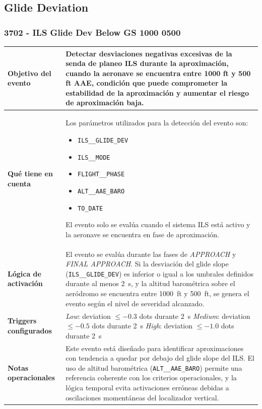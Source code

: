 \documentclass[11pt,a4paper]{article}
\begin{document}
	\subsection{Glide Deviation}
	
	\subsubsection{3702 - ILS Glide Dev Below GS 1000 0500}
	
	\renewcommand{\arraystretch}{1.3}
	\begin{longtable}{p{5cm} p{9.5cm}}
		\hline
		\textbf{Objetivo del evento} &
		Detectar desviaciones negativas excesivas de la senda de planeo ILS durante la aproximación, cuando la aeronave se encuentra entre 1000 ft y 500 ft AAE, condición que puede comprometer la estabilidad de la aproximación y aumentar el riesgo de aproximación baja. \\
		\hline
		
		\textbf{Qué tiene en cuenta} &
		Los parámetros utilizados para la detección del evento son:
		\begin{itemize}
			\item \texttt{ILS\_\_GLIDE\_DEV}
			\item \texttt{ILS\_\_MODE}
			\item \texttt{FLIGHT\_\_PHASE}
			\item \texttt{ALT\_\_AAE\_BARO}
			\item \texttt{TO\_DATE}
		\end{itemize}
		El evento solo se evalúa cuando el sistema ILS está activo y la aeronave se encuentra en fase de aproximación. \\
		\hline
		
		\textbf{Lógica de activación} &
		El evento se evalúa durante las fases de \textit{APPROACH} y \textit{FINAL APPROACH}.  
		Si la desviación del glide slope (\texttt{ILS\_\_GLIDE\_DEV}) es inferior o igual a los umbrales definidos durante al menos \SI{2}{s}, y la altitud barométrica sobre el aeródromo se encuentra entre \SI{1000}{ft} y \SI{500}{ft}, se genera el evento según el nivel de severidad alcanzado. \\
		\hline
		
		\textbf{Triggers configurados} &
		\textit{Low}: deviation $\leq -0.3$ dots durante \SI{2}{s} \newline
		\textit{Medium}: deviation $\leq -0.5$ dots durante \SI{2}{s} \newline
		\textit{High}: deviation $\leq -1.0$ dots durante \SI{2}{s} \\
		\hline
		
		\textbf{Notas operacionales} &
		Este evento está diseñado para identificar aproximaciones con tendencia a quedar por debajo del glide slope del ILS.  
		El uso de altitud barométrica (\texttt{ALT\_\_AAE\_BARO}) permite una referencia coherente con los criterios operacionales, y la lógica temporal evita activaciones erróneas debidas a oscilaciones momentáneas del localizador vertical. \\
		\hline
	\end{longtable} \newpage
	
\end{document}
